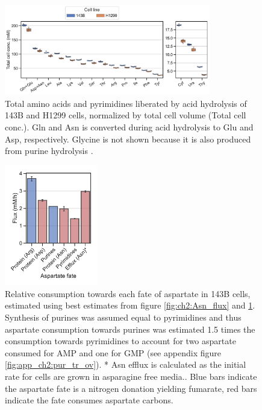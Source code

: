\begin{figure}
    \centering
    \includegraphics[width=0.80\textwidth]{figures/chap2/ah_cell_comp.pdf}
    \caption[Amino acid and pyrimidine total cell concentration.]{
    Total amino acids and pyrimidines liberated by acid hydrolysis of 143B and H1299 cells, normalized by total cell volume (Total cell conc.).
    Gln and Asn is converted during acid hydrolysis to Glu and Asp, respectively.
    Glycine is not shown because it is also produced from purine hydrolysis \cite{Markham1949-qy}.
    }
    \label{fig:ch2:ah_cell_comp}
\end{figure}

\begin{figure}[ht]
    \centering
    \includegraphics[width=0.36\textwidth]{figures/chap2/asp_fate.pdf}
    \caption[Relative consumption towards each fate of aspartate.]{
    Relative consumption towards each fate of aspartate in 143B cells, estimated using best estimates from figure \ref{fig:ch2:Asn_flux} and \ref{fig:ch2:ah_cell_comp}.
    Synthesis of purines was assumed equal to pyrimidines and thus aspartate consumption towards purines was estimated 1.5 times the consumption towards pyrimidines to account for two aspartate consumed for AMP and one for GMP (see appendix figure \ref{fig:app_ch2:pur_tr_ov}).
    * Asn efflux is calculated as the initial rate for cells are grown in asparagine free media..
    Blue bars indicate the aspartate fate is a nitrogen donation yielding fumarate, red bars indicate the fate consumes aspartate carbons.
    }
    \label{fig:ch2:asp_fate}
\end{figure}




